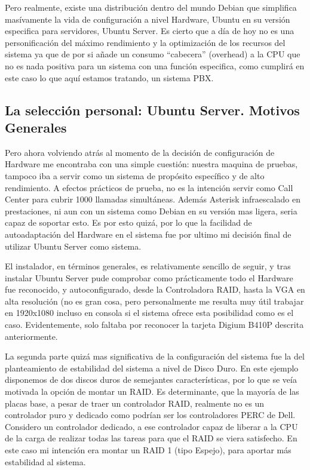 Pero realmente, existe una distribución dentro del mundo Debian que simplifica masívamente la vida de configuración a nivel Hardware, Ubuntu en su versión especifica para servidores, Ubuntu Server. Es cierto que a día de hoy no es una personificación del máximo rendimiento y la optimización de los recursos del sistema ya que de por si añade un consumo ``cabecera'' (overhead) a la CPU que no es nada positiva para un sistema con una función especifica, como cumplirá en este caso lo que aquí estamos tratando, un sistema PBX.

\subsection{La selección personal: Ubuntu Server. Motivos Generales}

Pero ahora volviendo atrás al momento de la decisión de configuración de Hardware me encontraba con una simple cuestión: nuestra maquina de pruebas, tampoco iba a servir como un sistema de propósito específico y de alto rendimiento. A efectos prácticos de prueba, no es la intención servir como Call Center para cubrir 1000 llamadas simultáneas. Además Asterisk infraescalado en prestaciones, ni aun con un sistema como Debian en su versión mas ligera, seria capaz de soportar esto. Es por esto quizá, por lo que la facilidad de autoadaptación del Hardware en el sistema fue por ultimo mi decisión final de utilizar Ubuntu Server como sistema.

El instalador, en términos generales, es relativamente sencillo de seguir, y tras instalar Ubuntu Server pude comprobar como prácticamente todo el Hardware fue reconocido, y autoconfigurado, desde la Controladora RAID, hasta la VGA en alta resolución (no es gran cosa, pero personalmente me resulta muy útil trabajar en 1920x1080 incluso en consola si el sistema ofrece esta posibilidad como es el caso. Evidentemente, solo faltaba por reconocer la tarjeta Digium B410P descrita anteriormente.

La segunda parte quizá mas significativa de la configuración del sistema fue la del planteamiento de estabilidad del sistema a nivel de Disco Duro. En este ejemplo disponemos de dos discos duros de semejantes características, por lo que se veía motivada la opción de montar un RAID. Es determinante, que la mayoría de las placas base, a pesar de traer un controlador RAID, realmente no es un controlador puro y dedicado como podrían ser los controladores PERC de Dell. Considero un controlador dedicado, a ese controlador capaz de liberar a la CPU de la carga de realizar todas las tareas para que el RAID se viera satisfecho. En este caso mi intención era montar un RAID 1 (tipo Espejo), para aportar más estabilidad al sistema.

